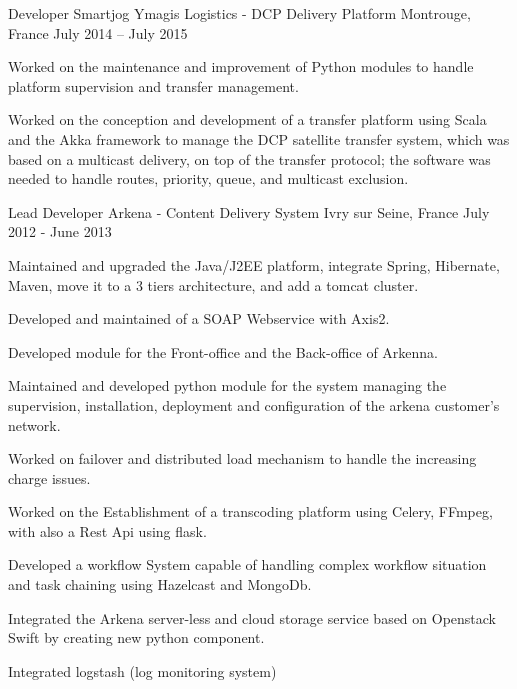\begin{cventries}
  \cventry
    {Developer} %
    {Smartjog Ymagis Logistics - DCP Delivery Platform} %
    {Montrouge, France} %
    {July 2014 – July 2015} %
    {
      \begin{cvitems} %
        \item {Worked on the maintenance and improvement of Python modules to handle platform supervision and transfer management.}
        \item {Worked on the conception and development of a transfer platform using Scala and the Akka framework to manage the DCP satellite transfer system, which was based on a multicast delivery, on top of the transfer protocol; the software was needed to handle routes, priority, queue, and multicast exclusion.}
      \end{cvitems} 
    }

  \cventry
    {Lead Developer} %
    {Arkena - Content Delivery System} %
    {Ivry sur Seine, France} %
    {July 2012 - June 2013} %
    {
      \begin{cvitems} %
        \item {Maintained and upgraded the Java/J2EE platform, integrate Spring, Hibernate, Maven, move it to a 3 tiers architecture, and add a tomcat cluster.}
        \item {Developed and maintained of a SOAP Webservice with Axis2.}
        \item {Developed module for the Front-office and the Back-office of Arkenna.}
        \item {Maintained and developed python module for the system managing the supervision, installation, deployment and configuration of the arkena customer’s network.}
        \item {Worked on failover and distributed load mechanism to handle the increasing charge issues.}
        \item {Worked on the Establishment of a transcoding platform using Celery, FFmpeg, with also a Rest Api using flask.}
        \item {Developed a workflow System capable of handling complex workflow situation and task chaining using Hazelcast and MongoDb.}
        \item {Integrated the Arkena server-less and cloud storage service based on Openstack Swift by creating new python component.}
        \item {Integrated logstash (log monitoring system)}
      \end{cvitems}
    }


\end{cventries}

